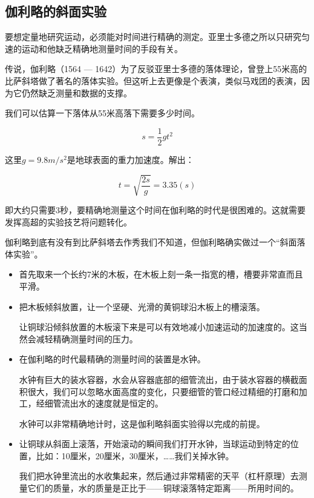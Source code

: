 \subsection{伽利略的斜面实验}

要想定量地研究运动，必须能对时间进行精确的测定。亚里士多德之所以只研究匀速的运动和他缺乏精确地测量时间的手段有关。

传说，伽利略（1564 — 1642）为了反驳亚里士多德的落体理论，曾登上55米高的比萨斜塔做了著名的落体实验。但这听上去更像是个表演，类似马戏团的表演，因为它仍然缺乏测量和数据的支撑。

我们可以估算一下落体从55米高落下需要多少时间。

\begin{equation}
s = \frac{1}{2} g t^2
\end{equation}

这里$g = 9.8 m/s^2$是地球表面的重力加速度。解出：

\begin{equation*}
t = \sqrt{\frac{2 s}{ g}} = 3.35(s)
\end{equation*}

即大约只需要3秒，要精确地测量这个时间在伽利略的时代是很困难的。这就需要发挥高超的实验技艺将问题转化。

伽利略到底有没有到比萨斜塔去作秀我们不知道，但伽利略确实做过一个“斜面落体实验”。

\begin{itemize}
\item 

首先取来一个长约7米的木板，在木板上刻一条一指宽的槽，槽要非常直而且平滑。

\item

把木板倾斜放置，让一个坚硬、光滑的黄铜球沿木板上的槽滚落。

让铜球沿倾斜放置的木板滚下来是可以有效地减小加速运动的加速度的。这当然会减轻精确测量时间的压力。

\item

在伽利略的时代最精确的测量时间的装置是水钟。

水钟有巨大的装水容器，水会从容器底部的细管流出，由于装水容器的横截面积很大，我们可以忽略水面高度的变化，只要细管的管口经过精细的打磨和加工，经细管流出水的速度就是恒定的。

水钟可以非常精确地计时，这是伽利略斜面实验得以完成的前提。

\item

让铜球从斜面上滚落，开始滚动的瞬间我们打开水钟，当球运动到特定的位置，比如：10厘米，20厘米，30厘米，……我们关掉水钟。

我们把水钟里流出的水收集起来，然后通过非常精密的天平（杠杆原理）去测量它们的质量，水的质量是正比于——铜球滚落特定距离——所用时间的。

\end{itemize}

